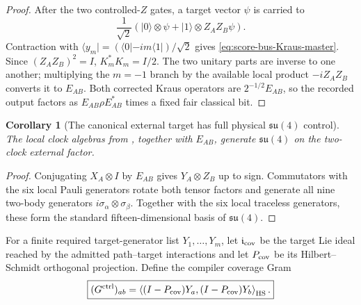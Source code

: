 \documentclass[11pt]{article}
\newtheorem{corollary}[theorem]{Corollary}
\theoremstyle{definition}
\theoremstyle{remark}
\begin{document}
\begin{proof}
After the two controlled-$Z$ gates, a target vector $\psi$ is carried to
\[
 \frac1{\sqrt2}\left(
 |0\rangle\otimes\psi
 +|1\rangle\otimes Z_AZ_B\psi\right).
\]
Contraction with
$\langle y_m|=(\langle0|-im\langle1|)/\sqrt2$ gives
\eqref{eq:score-bus-Kraus-master}.  Since $(Z_AZ_B)^2=I$,
$K_m^*K_m=I/2$.  The two unitary parts are inverse to one another; multiplying
the $m=-1$ branch by the available local product $-iZ_AZ_B$ converts it to
$E_{AB}$.  Both corrected Kraus operators are
$2^{-1/2}E_{AB}$, so the recorded output factors as
$E_{AB}\rho E_{AB}^*$ times a fixed fair classical bit.
\end{proof}

\begin{corollary}[The canonical external target has full physical
$\mathfrak{su}(4)$ control]
\label{cor:external-su4-score-master}
The local clock algebras from
, together with
$E_{AB}$, generate $\mathfrak{su}(4)$ on the two-clock external factor.
\end{corollary}

\begin{proof}
Conjugating $X_A\otimes I$ by $E_{AB}$ gives
$Y_A\otimes Z_B$ up to sign.  Commutators with the six local Pauli
generators rotate both tensor factors and generate all nine two-body
generators
$i\sigma_\alpha\otimes\sigma_\beta$.  Together with the six local traceless
generators, these form the standard fifteen-dimensional basis of
$\mathfrak{su}(4)$.
\end{proof}

For a finite required target-generator list $Y_1,\ldots,Y_m$, let
$\mathfrak i_{\rm cov}$ be the target Lie ideal reached by the admitted
path--target interactions and let $P_{\rm cov}$ be its Hilbert--Schmidt
orthogonal projection.  Define the compiler coverage Gram
\begin{equation}
 \boxed{
 (G^{\rm ctrl})_{ab}
 =\left\langle
 (I-P_{\rm cov})Y_a,(I-P_{\rm cov})Y_b
 \right\rangle_{\rm HS}.}
 \label{eq:compiler-Gram-master}
\end{equation}
\end{document}
